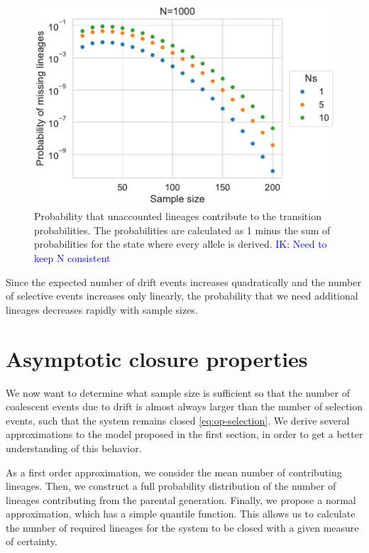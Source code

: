 \documentclass[review]{elsarticle}
\newcommand{\ikcomment}[1]{\textcolor{blue}{IK: #1}}
\begin{document}
\begin{figure}
  \centering
  \includegraphics[]{fig/missing.pdf}
  \caption{Probability that unaccounted lineages contribute to the transition probabilities. The
    probabilities are calculated as 1 minus the sum of probabilities for the state where every
    allele is derived. \ikcomment{Need to keep N consistent}}
  \label{fig:missing}
\end{figure}

Since the expected number of drift events increases quadratically and the number of selective events
increases only linearly, the probability that we need additional lineages decreases rapidly with
sample sizes.

\section{Asymptotic closure properties}

We now want to determine what sample size is sufficient so that the number of coalescent events due
to drift is almost always larger than the number of selection events, such that the system remains
closed \eqref{eq:op-selection}. We derive several approximations to the model proposed in the first
section, in order to get a better understanding of this behavior.

As a first order approximation, we consider the mean number of contributing lineages. Then, we
construct a full probability distribution of the number of lineages contributing from the parental
generation. Finally, we propose a normal approximation, which has a simple quantile
function. This allows us to calculate the number of required lineages for the system to be closed
with a given measure of certainty.
\end{document}
